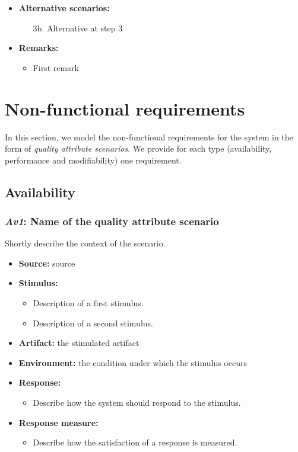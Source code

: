 \documentclass[english,peerreview]{sareport}
\begin{document}
\begin{itemize}
    \item \textbf{Alternative scenarios:} 
    \begin{enumerate}
        \item [3b.] Alternative at step 3
    \end{enumerate}
    
    \item \textbf{Remarks:}
        \begin{itemize}
            \item First remark
        \end{itemize}
\end{itemize}

\chapter{Non-functional requirements}\label{sec:non-functional}
In this section, we model the non-functional requirements for the system in the
form of \emph{quality attribute scenarios}. We provide for each type
(availability, performance and modifiability) one requirement.

\section{Availability}
\subsection{\emph{Av1}: Name of the quality attribute scenario}
Shortly describe the context of the scenario.

\begin{itemize}
    \item \textbf{Source:} source
    \item \textbf{Stimulus:}
        \begin{itemize}
            \item Description of a first stimulus.
            \item Description of a second stimulus.
        \end{itemize}

    \item \textbf{Artifact:} the stimulated artifact
    \item \textbf{Environment:} the condition under which the stimulus occurs
    \item \textbf{Response:}
        \begin{itemize}
            \item Describe how the system should respond to the stimulus.
        \end{itemize}

    \item \textbf{Response measure:}
        \begin{itemize}
            \item Describe how the satisfaction of a response is measured.
        \end{itemize}
\end{itemize}
\end{document}
